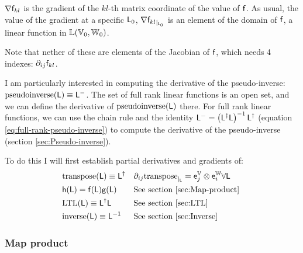 ${\mathbf \nabla}{\mathsf{f}_{kl}}$ is the gradient of the $kl$-th matrix coordinate of the value of $\mathsf{f}$.
As usual, the value of the gradient at a specific $\mathsf{L}_0$,
${\mathbf \nabla}{\mathsf{f}_{kl}}_{\mid_{\mathsf{L}_0}}$ is an element of the domain of $\mathsf{f}$,
a linear function in $\mathbb{L}(\mathbb{V}_0,\mathbb{W}_0)$.

Note that nether of these are elements of the Jacobian of $\mathsf{f}$,
which needs 4 indexes: ${\partial}_{ij}{\mathsf{f}_{kl}}$.

I am particularly interested in computing the derivative of the
pseudo-inverse: $\mathrm{pseudoinverse}(\mathsf{L}) \equiv \mathsf{L}^{-}$.
The set of full rank linear functions is an open set,
and we can define the derivative of $\mathrm{pseudoinverse}(\mathsf{L})$ there.
For full rank linear functions,
we can use the chain rule and the identity
$\mathsf{L}^{-} = \left( \mathsf{L}^{\dagger} \mathsf{L} \right)^{-1} \mathsf{L}^{\dagger}$
(equation \ref{eq:full-rank-pseudo-inverse})
to compute the derivative of the pseudo-inverse
(section \ref{sec:Pseudo-inverse}).

To do this I will first establish partial derivatives and gradients of:
\begin{align}
\label{eq:transpose-derivative}
&\mathrm{transpose}(\mathsf{L}) \equiv \mathsf{L}^{\dagger}
&&{\partial}_{ij}{\mathrm{transpose}}_{\mid_{\mathsf{L}}} =  \mathsf{e}_j^{\mathbb{V}} \otimes \mathsf{e}_i^{\mathbb{W}}
\forall \mathsf{L}
\\
&\mathsf{h}( \mathsf{L} ) = \mathsf{f} ( \mathsf{L} ) \mathsf{g} ( \mathsf{L} )
&&\text{See section \ref{sec:Map-product} }
\\
&\mathrm{LTL}(\mathsf{L}) \equiv \mathsf{L}^{\dagger} \mathsf{L}
&&\text{See section \ref{sec:LTL} }
\\
&\mathrm{inverse}(\mathsf{L}) \equiv \mathsf{L}^{-1}
&&\text{See section \ref{sec:Inverse} }
\end{align}


\subsubsection{Map product}
\label{sec:Map-product}

